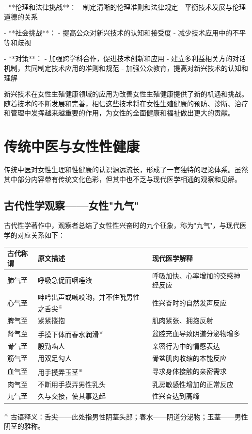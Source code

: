 \begin{enumerate}
- **伦理和法律挑战**：
  - 制定清晰的伦理准则和法律规定
  - 平衡技术发展与伦理道德的关系

- **社会挑战**：
  - 提高公众对新兴技术的认知和接受度
  - 减少技术应用中的不平等和歧视

- **对策**：
  - 加强跨学科合作，促进技术创新和应用
  - 建立多利益相关方的对话机制，共同制定技术应用的准则和规范
  - 加强公众教育，提高对新兴技术的认知和理解

新兴技术在女性生殖健康领域的应用为改善女性生殖健康提供了新的机遇和挑战。随着技术的不断发展和完善，相信这些技术将在女性生殖健康的预防、诊断、治疗和管理中发挥越来越重要的作用，为女性的全面健康和福祉做出更大的贡献。

\section{传统中医与女性性健康}

传统中医对女性生理和性健康的认识源远流长，形成了一套独特的理论体系。虽然其中部分内容带有传统文化色彩，但其中也不乏与现代医学相通的观察和见解。

\subsection{古代性学观察——女性"九气"}

古代性学著作中，观察者总结了女性性兴奋时的九个征象，称为"九气"，与现代医学的对应关系如下：

\begin{tabular}{p{2cm} p{5cm} p{4.5cm}}
\toprule
\textbf{古代称谓} & \textbf{原文描述} & \textbf{现代医学解释} \\
\midrule
肺气至 & 呼吸急促而咽唾液 & 呼吸加快、心率增加的交感神经反应 \\
心气至 & 呻吟出声或喊哎哟，并不住吮男性之舌尖\textsuperscript{※} & 性兴奋时的自然发声反应 \\
脾气至 & 紧紧搂抱 & 肌肉紧张、拥抱反射 \\
肾气至 & 手摸下体而春水润滑\textsuperscript{※} & 盆腔充血导致阴道分泌物增多 \\
骨气至 & 殷勤啮人 & 亲密行为中的情感表达 \\
筋气至 & 用双足勾人 & 骨盆肌肉收缩的本能反应 \\
血气至 & 用手摸弄玉茎\textsuperscript{※} & 寻求身体接触的亲密需求 \\
肉气至 & 不断用手摸弄男性乳头 & 乳房敏感性增加的正常反应 \\
九气至 & 久与交接，使其事迭起 & 性兴奋达到高峰 \\
\bottomrule
\end{tabular}
\addtocounter{footnote}{-3}
\begin{flushleft}
\textsuperscript{※} 古语释义：舌尖——此处指男性阴茎头部；春水——阴道分泌物；玉茎——男性阴茎的雅称。\\
\end{flushleft}


\end{enumerate}
